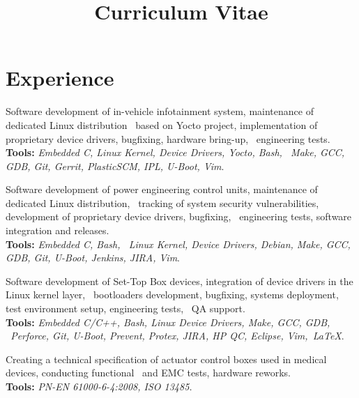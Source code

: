 \documentclass[11pt,a4paper,sans]{moderncv} %
\title{Curriculum Vitae}
\begin{document}
\makecvtitle %


\section{Experience}

{Software development of in-vehicle infotainment system, maintenance of dedicated Linux distribution \
based on Yocto project, implementation of proprietary device drivers, bugfixing, hardware bring-up, \
engineering tests.\\ \textbf{Tools:} \textit{Embedded C, Linux Kernel, Device Drivers, Yocto, Bash, \
Make, GCC, GDB, Git, Gerrit, PlasticSCM, IPL, U-Boot, Vim}.}


{Software development of power engineering control units, maintenance of dedicated Linux distribution, \
tracking of system security vulnerabilities, development of proprietary device drivers, bugfixing, \
engineering tests, software integration and releases. \\ \textbf{Tools:} \textit{Embedded C, Bash, \
Linux Kernel, Device Drivers, Debian, Make, GCC, GDB, Git, U-Boot, Jenkins, JIRA, Vim}.}


{Software development of Set-Top Box devices, integration of device drivers in the Linux kernel layer, \
bootloaders development, bugfixing, systems deployment, test environment setup, engineering tests, \
QA support. \\ \textbf{Tools:} \textit{Embedded C/C++, Bash, Linux Device Drivers, Make, GCC, GDB, \
Perforce, Git, U-Boot, Prevent, Protex, JIRA, HP QC, Eclipse, Vim,~\LaTeX}.}

{Creating a technical specification of actuator control boxes used in medical devices, conducting functional \
and EMC tests, hardware reworks. \\ \textbf{Tools:} \textit{PN-EN 61000-6-4:2008, ISO 13485.}}
\end{document}
